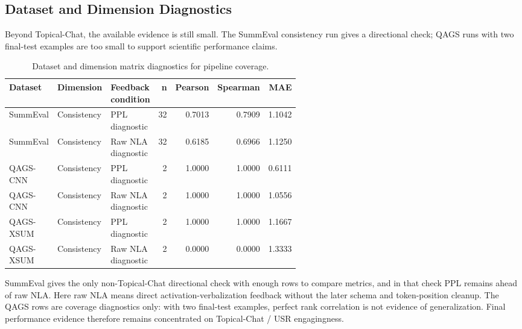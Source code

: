 \documentclass[12pt,a4paper,twoside,openright]{book}
\begin{document}
\subsection{Dataset and Dimension Diagnostics}
\label{subsec:results-gepa-matrix}

Beyond Topical-Chat, the available evidence is still small. The SummEval
consistency run gives a directional check; QAGS runs with two final-test
examples are too small to support scientific performance claims.

\begin{table}[!htb]
    \centering
    \scriptsize
    \begin{adjustbox}{width=\textwidth}
    \begin{tabular}{p{0.18\linewidth} p{0.18\linewidth} p{0.20\linewidth} r r r r}
        \toprule
        \textbf{Dataset} & \textbf{Dimension} & \textbf{Feedback condition} & \textbf{n} & \textbf{Pearson} & \textbf{Spearman} & \textbf{MAE} \\
        \midrule
        SummEval &
        Consistency & PPL diagnostic & 32 & 0.7013 & 0.7909 & 1.1042 \\
        SummEval &
        Consistency & Raw NLA diagnostic & 32 & 0.6185 & 0.6966 & 1.1250 \\
        QAGS-CNN &
        Consistency & PPL diagnostic & 2 & 1.0000 & 1.0000 & 0.6111 \\
        QAGS-CNN &
        Consistency & Raw NLA diagnostic & 2 & 1.0000 & 1.0000 & 1.0556 \\
        QAGS-XSUM &
        Consistency & PPL diagnostic & 2 & 1.0000 & 1.0000 & 1.1667 \\
        QAGS-XSUM &
        Consistency & Raw NLA diagnostic & 2 & 0.0000 & 0.0000 & 1.3333 \\
        \bottomrule
    \end{tabular}
    \end{adjustbox}
    \caption{Dataset and dimension matrix diagnostics for pipeline coverage.}
    \label{tab:gepa-dataset-diagnostics}
\end{table}

SummEval gives the only non-Topical-Chat directional check with enough rows to
compare metrics, and in that check PPL remains ahead of raw NLA. Here raw NLA
means direct activation-verbalization feedback without the later schema and
token-position cleanup. The QAGS rows are coverage diagnostics only: with two
final-test examples, perfect rank correlation is not evidence of generalization.
Final performance evidence therefore remains concentrated on Topical-Chat / USR
engagingness.
\end{document}
